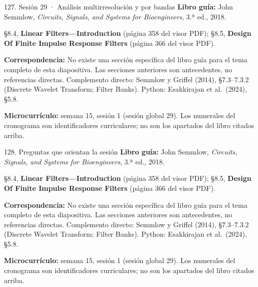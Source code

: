 \documentclass[
  10pt,
  ignorenonframetext,
  aspectratio=169,
  spanish,
]{beamer}
\begin{document}
\begin{frame}{127. Sesión 29 · Análisis multirresolución y por bandas}
\label{sesiuxf3n-29-anuxe1lisis-multirresoluciuxf3n-y-por-bandas}
\textbf{Libro guía:} John Semmlow, \emph{Circuits, Signals, and Systems
for Bioengineers}, 3.ª ed., 2018.

§8.4, \textbf{Linear Filters---Introduction} (página 358 del visor PDF);
§8.5, \textbf{Design Of Finite Impulse Response Filters} (página 366 del
visor PDF).

\textbf{Correspondencia:} No existe una sección específica del libro
guía para el tema completo de esta diapositiva. Las secciones anteriores
son antecedentes, no referencias directas. Complemento directo: Semmlow
y Griffel (2014), §7.3--7.3.2 (Discrete Wavelet Transform; Filter
Banks). Python: Esakkirajan et al.~(2024), §5.8.

\textbf{Microcurrículo:} semana 15, sesión 1 (sesión global 29). Los
numerales del cronograma son identificadores curriculares; no son los
apartados del libro citados arriba.
\end{frame}

\begin{frame}{128. Preguntas que orientan la sesión}
\label{preguntas-que-orientan-la-sesiuxf3n-8}
\textbf{Libro guía:} John Semmlow, \emph{Circuits, Signals, and Systems
for Bioengineers}, 3.ª ed., 2018.

§8.4, \textbf{Linear Filters---Introduction} (página 358 del visor PDF);
§8.5, \textbf{Design Of Finite Impulse Response Filters} (página 366 del
visor PDF).

\textbf{Correspondencia:} No existe una sección específica del libro
guía para el tema completo de esta diapositiva. Las secciones anteriores
son antecedentes, no referencias directas. Complemento directo: Semmlow
y Griffel (2014), §7.3--7.3.2 (Discrete Wavelet Transform; Filter
Banks). Python: Esakkirajan et al.~(2024), §5.8.

\textbf{Microcurrículo:} semana 15, sesión 1 (sesión global 29). Los
numerales del cronograma son identificadores curriculares; no son los
apartados del libro citados arriba.
\end{frame}
\end{document}
